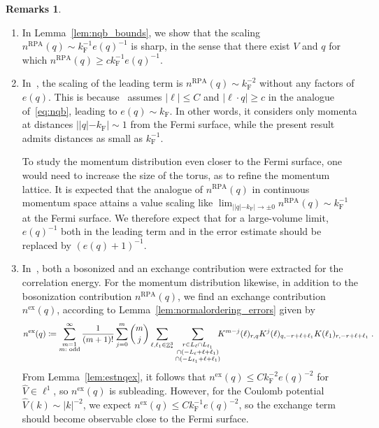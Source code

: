 \documentclass[12pt,a4paper]{article}
\numberwithin{equation}{section}
\newcommand{\1}{\mathbb{I}}
\newcommand{\ex}{\mathrm{ex}}
\newcommand{\F}{\mathrm{F}}
\newcommand{\RPA}{\mathrm{RPA}}
\DeclareMathOperator{\Z}{\mathbb{Z}}
\theoremstyle{plain}
\theoremstyle{definition}
\newtheorem*{remarks}{Remarks}
\theoremstyle{remark}
\theoremstyle{plain}
\theoremstyle{definition}
\theoremstyle{remark}
\begin{document}
\begin{remarks}
\begin{enumerate}

\item In Lemma~\ref{lem:nqb_bounds}, we show that the scaling $ n^{\RPA}(q) \sim k_{\F}^{-1} e(q)^{-1} $ is sharp, in the sense that there exist $ V $ and $ q $  for which $ n^{\RPA}(q) \ge c k_{\F}^{-1} e(q)^{-1} $. \todo{Make sure that $ n^{\RPA}(q) \ge c k_{\F}^{-1} e(q)^{-1} $ is true.}

\item In~\cite{BL25}, the scaling of the leading term is $ n^{\RPA}(q) \sim k_{\F}^{-2} $ without any factors of $ e(q) $. This is because~\cite{BL25} assumes $ |\ell| \le C $ and $ |\ell \cdot q| \ge c $ in the analogue of~\eqref{eq:nqb}, leading to $ e(q) \sim k_{\F} $. In other words, it considers only momenta at distances $ ||q|-k_{\F}| \sim 1 $ from the Fermi surface, while the present result admits distances as small as $ k_{\F}^{-1} $.

To study the momentum distribution even closer to the Fermi surface, one would need to increase the size of the torus, as to refine the momentum lattice. It is expected \cite{DV60} that the analogue of $ n^{\RPA}(q) $ in continuous momentum space attains a value scaling like $ \lim_{||q|-k_{\F}| \to \pm 0} n^{\RPA}(q) \sim k_{\F}^{-1} $ at the Fermi surface. We therefore expect that for a large-volume limit, $ e(q)^{-1} $ both in the leading term and in the error estimate should be replaced by $ (e(q)+1)^{-1} $.


\item In~\cite{CHN23,CHN24}, both a bosonized and an exchange contribution were extracted for the correlation energy. For the momentum distribution likewise, in addition to the bosonization contribution $ n^{\RPA}(q) $, we find an exchange contribution $ n^{\ex}(q) $, according to Lemma~\ref{lem:normalordering_errors} given by
\begin{equation} \label{eq:nqex}
	n^{\ex}(q)
	\coloneq \sum_{\substack{m=1\\m:\textnormal{ odd}}}^\infty \frac{1}{(m+1)!} \sum_{j=0}^m {{m} \choose {j}}
		\sum_{\ell,\ell_1 \in \Z^3_*}\sum_{\substack{r\in L_{\ell} \cap L_{\ell_1}\\ \cap (-L_{\ell}+\ell+\ell_1) \\ \cap (-L_{\ell_1}+\ell+\ell_1 )}} \!\!\!
		K^{m-j}(\ell)_{r,q}
		K^j(\ell)_{q,-r+\ell+\ell_1}
		K(\ell_1)_{r,-r+\ell+\ell_1} \;.
\end{equation}
From Lemma~\ref{lem:estnqex}, it follows that $ n^{\ex}(q) \le C k_{\F}^{-2} e(q)^{-2} $ for $ \hat{V} \in \ell^1 $, so $ n^{\ex}(q) $ is subleading. However, for the Coulomb potential $ \hat{V}(k) \sim |k|^{-2} $, we expect $ n^{\ex}(q) \le C k_{\F}^{-1} e(q)^{-2} $, so the exchange term should become observable close to the Fermi surface.


\end{enumerate}
\end{remarks}
\end{document}
